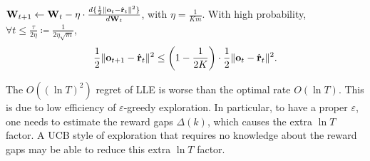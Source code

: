 	\begin{lem}
		\label{lem:logit_l2_loss_parameter_smoothness}
		${\mathbf{W}}_{t+1} \gets {\mathbf{W}}_t - \eta \cdot \frac{d \{ \frac{1}{2} \| {\mathbf{o}}_t - \hat{{\mathbf{r}}}_t \|^2 \}}{d {\mathbf{W}}_t}$, with $\eta = \frac{1}{K m}$. With high probability, $\forall t \le \frac{\tau}{2 \eta} \coloneqq \frac{1}{2 \eta \sqrt{m}}$, 
		\begin{equation*}
		\begin{split}
		\frac{1}{2} \| {\mathbf{o}}_{t+1} - \hat{{\mathbf{r}}}_t \|^2 \le \left( 1 - \frac{1}{2 K} \right) \cdot \frac{1}{2} \| {\mathbf{o}}_t - \hat{{\mathbf{r}}}_t \|^2.
		\end{split}
		\end{equation*}
	\end{lem}
	
\begin{remk}
	The $O((\ln T)^2)$ regret of LLE is worse than the optimal rate $O(\ln T)$. 
	This is due to low efficiency of $\varepsilon$-greedy exploration.
	In particular, to have a proper $\varepsilon$, one needs to estimate the reward gaps $\Delta(k)$, which causes the extra $\ln T$ factor.
	A UCB style of exploration that requires no knowledge about the reward gaps may be able to reduce this extra $\ln T$ factor.
\end{remk}

